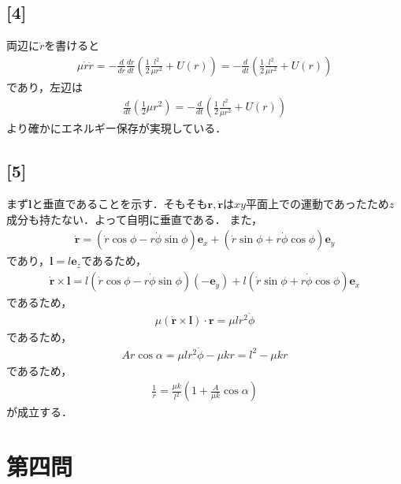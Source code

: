 \documentclass[12pt,dvipdfmx]{jsarticle}
\begin{document}
\subsection*{\large{[4]}}
両辺に$\dot{r}$を書けると
\begin{eqnarray}
  \mu\dot{r}\ddot{r} = -\frac{d}{dr}\frac{dr}{dt} \left( \frac{1}{2}\frac{l^2}{\mu r^2} +U(r) \right)  = - \frac{d}{dt}\left( \frac{1}{2}\frac{l^2}{\mu r^2} +U(r) \right) 
\end{eqnarray}
であり，左辺は
\begin{eqnarray}
  \frac{d}{dt} \left( \frac{1}{2}\mu r^2 \right) =  - \frac{d}{dt}\left( \frac{1}{2}\frac{l^2}{\mu r^2} +U(r) \right) 
\end{eqnarray}
より確かにエネルギー保存が実現している．
\subsection*{\large{[5]}}
まず$\bm{l}$と垂直であることを示す．そもそも$\bm{r},\dot{\bm{r}}$は$xy$平面上での運動であったため$z$成分も持たない．よって自明に垂直である．
また，
\begin{eqnarray}
  \bm{\dot{r}} =\left( \dot{r}\cos\phi-r\dot{\phi}\sin\phi \right)\bm{e}_x + \left( \dot{r}\sin\phi+r\dot{\phi}\cos\phi \right)\bm{e}_y
\end{eqnarray}
であり，$\bm{l}=l\bm{e}_z$であるため，
\begin{eqnarray}
  \bm{\dot{r}}\times\bm{l}= l\left( \dot{r}\cos\phi-r\dot{\phi}\sin\phi \right)(-\bm{e}_y)+ l \left( \dot{r}\sin\phi+r\dot{\phi}\cos\phi \right)\bm{e}_x
\end{eqnarray}
であるため，
\begin{eqnarray}
  \mu\left( \bm{\dot{r}}\times\bm{l} \right)\cdot\bm{r} = \mu l r^2 \dot{\phi}
\end{eqnarray}
であるため，
\begin{eqnarray}
  Ar\cos\alpha =  \mu l r^2 \dot{\phi}-\mu k r = l^2 - \mu k r
\end{eqnarray}
であるため，
\begin{eqnarray}
  \frac{1}{r} = \frac{\mu k}{l^2}\left( 1+\frac{A}{\mu k}\cos\alpha \right) 
\end{eqnarray}
が成立する．

\newpage

\section*{\Large{第四問}}
\end{document}
